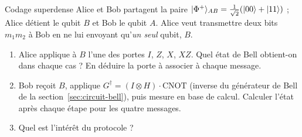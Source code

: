 \begin{exercice}{Codage superdense}\label{ex:superdense}
Alice et Bob partagent la paire $|\Phi^+\rangle_{AB}=\frac{1}{\sqrt2}(|00\rangle+|11\rangle)$ ; Alice détient le
qubit $B$ et Bob le qubit $A$. Alice veut transmettre deux bits $m_1m_2$ à Bob en ne lui envoyant
qu'\emph{un seul} qubit, $B$.
\begin{enumerate}[label=\arabic*.,nosep]
  \item Alice applique à $B$ l'une des portes $I$, $Z$, $X$, $XZ$. Quel état de Bell obtient-on dans
        chaque cas ? En déduire la porte à associer à chaque message.
  \item Bob reçoit $B$, applique $G^\dagger=(I\otimes H)\cdot\mathrm{CNOT}$ (inverse du générateur de Bell
        de la section~\ref{sec:circuit-bell}), puis mesure en base de calcul. Calculer l'état après
        chaque étape pour les quatre messages.
  \item Quel est l'intérêt du protocole ?
\end{enumerate}
\end{exercice}

